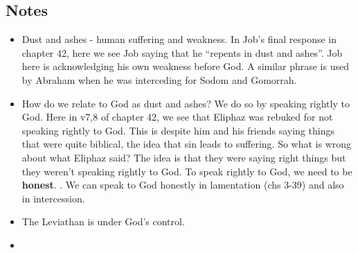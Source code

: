 \subsection*{Notes}
\begin{itemize}
  \item{Dust and ashes - human suffering and weakness. In Job's final
  response in chapter 42, here we see Job saying that he ``repents in dust
  and ashes''. Job here is acknowledging his own weakness before God. A
  similar phrase is used by Abraham when he was interceding for Sodom and
  Gomorrah.}
  \item{How do we relate to God as dust and ashes? We do so by speaking
  rightly to God. Here in v7,8 of chapter 42, we see that Eliphaz was rebuked
  for not speaking rightly to God. This is despite him and his friends saying
  things that were quite biblical, the idea that sin leads to suffering. So
  what is wrong about what Eliphaz said? The idea is that they were saying
  right things but they weren't speaking rightly to God. To speak rightly to
  God, we need to be \textbf{honest}. . We can speak to God honestly in lamentation (chs 3-39)
  and also in intercession.}
  \item{The Leviathan is under God's control.}
  \item{}
\end{itemize}